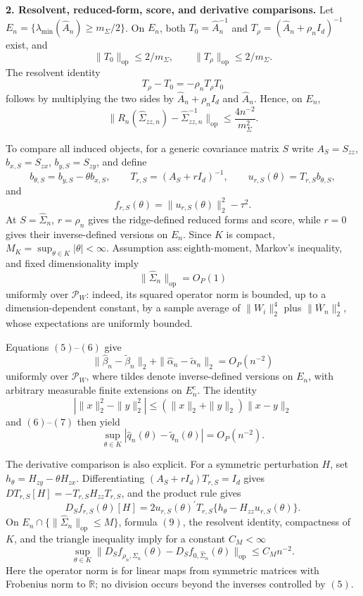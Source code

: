\textbf{2. Resolvent, reduced-form, score, and derivative comparisons.}
Let \(E_n=\{\lambda_{\min}(\widehat A_n)\geq m_{\Sigma}/2\}\). On \(E_n\), both \(T_0=\widehat A_n^{-1}\) and \(T_{\rho}=(\widehat A_n+\rho_n I_d)^{-1}\) exist, and
\[
 \|T_0\|_{\mathrm{op}}\leq 2/m_{\Sigma},
 \qquad
 \|T_{\rho}\|_{\mathrm{op}}\leq 2/m_{\Sigma}.
\]
The resolvent identity
\[
 T_{\rho}-T_0=-\rho_nT_{\rho}T_0
\]
follows by multiplying the two sides by \(\widehat A_n+\rho_nI_d\) and \(\widehat A_n\). Hence, on \(E_n\),
\[
 \|R_n(\widehat\Sigma_{zz,n})-\widehat\Sigma_{zz,n}^{-1}\|_{\mathrm{op}}
 \leq \frac{4n^{-2}}{m_{\Sigma}^2}. \tag{5}
\]

To compare all induced objects, for a generic covariance matrix \(S\) write \(A_S=S_{zz}\), \(b_{x,S}=S_{zx}\), \(b_{y,S}=S_{zy}\), and define
\[
 b_{\theta,S}=b_{y,S}-\theta b_{x,S},\qquad
 T_{r,S}=(A_S+rI_d)^{-1},\qquad
 u_{r,S}(\theta)=T_{r,S}b_{\theta,S},
\]
and
\[
 f_{r,S}(\theta)=\|u_{r,S}(\theta)\|_2^2-\tau^2.
\]
At \(S=\widehat\Sigma_n\), \(r=\rho_n\) gives the ridge-defined reduced forms and score, while \(r=0\) gives their inverse-defined versions on \(E_n\). Since \(K\) is compact, \(M_K=\sup_{\theta\in K}|\theta|<\infty\). Assumption \(\mathrm{ass:eighth\mbox{-}moment}\), Markov's inequality, and fixed dimensionality imply
\[
 \|\widehat\Sigma_n\|_{\mathrm{op}}=O_P(1) \tag{6}
\]
uniformly over \(\mathcal P_W\): indeed, its squared operator norm is bounded, up to a dimension-dependent constant, by a sample average of \(\|W_i\|_2^4\) plus \(\|\overline W_n\|_2^4\), whose expectations are uniformly bounded.

Equations \((5)\)--\((6)\) give
\[
 \|\widehat\beta_n-\widetilde\beta_n\|_2
 +\|\widehat\alpha_n-\widetilde\alpha_n\|_2
 =O_P(n^{-2}) \tag{7}
\]
uniformly over \(\mathcal P_W\), where tildes denote inverse-defined versions on \(E_n\), with arbitrary measurable finite extensions on \(E_n^c\). The identity
\[
 |\|x\|_2^2-\|y\|_2^2|
 \leq (\|x\|_2+\|y\|_2)\|x-y\|_2
\]
and \((6)\)--\((7)\) then yield
\[
 \sup_{\theta\in K}|\widehat q_n(\theta)-\widetilde q_n(\theta)|=O_P(n^{-2}). \tag{8}
\]

The derivative comparison is also explicit. For a symmetric perturbation \(H\), set \(h_\theta=H_{zy}-\theta H_{zx}\). Differentiating \((A_S+rI_d)T_{r,S}=I_d\) gives \(D T_{r,S}[H]=-T_{r,S}H_{zz}T_{r,S}\), and the product rule gives
\[
 D_Sf_{r,S}(\theta)[H]
 =2u_{r,S}(\theta)^{\prime}T_{r,S}
   \{h_\theta-H_{zz}u_{r,S}(\theta)\}. \tag{9}
\]
On \(E_n\cap\{\|\widehat\Sigma_n\|_{\mathrm{op}}\leq M\}\), formula \((9)\), the resolvent identity, compactness of \(K\), and the triangle inequality imply for a constant \(C_M<\infty\)
\[
 \sup_{\theta\in K}
 \|D_Sf_{\rho_n,\widehat\Sigma_n}(\theta)
      -D_Sf_{0,\widehat\Sigma_n}(\theta)\|_{\mathrm{op}}
 \leq C_Mn^{-2}. \tag{10}
\]
Here the operator norm is for linear maps from symmetric matrices with Frobenius norm to \(\mathbb R\); no division occurs beyond the inverses controlled by \((5)\).

